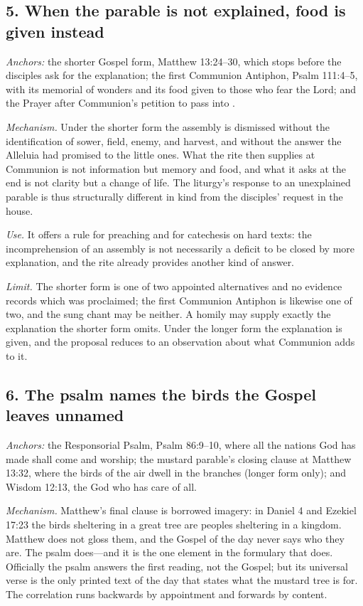 \subsection*{5. When the parable is not explained, food is given instead}

\emph{Anchors:} the shorter Gospel form, Matthew 13:24--30, which stops before
the disciples ask for the explanation; the first Communion Antiphon, Psalm
111:4--5, with its memorial of wonders and its food given to those who fear the
Lord; and the Prayer after Communion's petition to pass 
into .

\emph{Mechanism.} Under the shorter form the assembly is dismissed without the
identification of sower, field, enemy, and harvest, and without the answer the
Alleluia had promised to the little ones. What the rite then supplies at
Communion is not information but memory and food, and what it asks at the end
is not clarity but a change of life. The liturgy's response to an unexplained
parable is thus structurally different in kind from the disciples' request in
the house.

\emph{Use.} It offers a rule for preaching and for catechesis on hard texts:
the incomprehension of an assembly is not necessarily a deficit to be closed by
more explanation, and the rite already provides another kind of answer.

\emph{Limit.} The shorter form is one of two appointed alternatives and no
evidence records which was proclaimed; the first Communion Antiphon is likewise
one of two, and the sung chant may be neither. A homily may supply exactly the
explanation the shorter form omits. Under the longer form the explanation is
given, and the proposal reduces to an observation about what Communion adds to
it.

\subsection*{6. The psalm names the birds the Gospel leaves unnamed}

\emph{Anchors:} the Responsorial Psalm, Psalm 86:9--10, where all the nations
God has made shall come and worship; the mustard parable's closing clause at
Matthew 13:32, where the birds of the air dwell in the branches (longer form
only); and Wisdom 12:13, the God who has care of all.

\emph{Mechanism.} Matthew's final clause is borrowed imagery: in Daniel 4 and
Ezekiel 17:23 the birds sheltering in a great tree are peoples sheltering in a
kingdom. Matthew does not gloss them, and the Gospel of the day never says who
they are. The psalm does---and it is the one element in the formulary that
does. Officially the psalm answers the first reading, not the Gospel; but its
universal verse is the only printed text of the day that states what the
mustard tree is for. The correlation runs backwards by appointment and
forwards by content.

